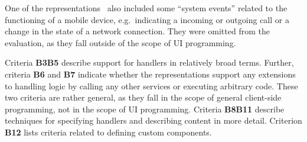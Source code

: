 One of the representations~\cite{Gaouar2018} also included some \enquote{system events} related to the functioning of a mobile device, e.g.\ indicating a incoming or outgoing call or a change in the state of a network connection.
They were omitted from the evaluation, as they fall outside of the scope of UI programming.

Criteria \textbf{B3}\textendash\textbf{B5} describe support for handlers in relatively broad terms.
Further, criteria \textbf{B6} and \textbf{B7} indicate whether the representations support any extensions to handling logic by calling any other services or executing arbitrary code.
These two criteria are rather general, as they fall in the scope of general client-side programming, not in the scope of UI programming.
Criteria \textbf{B8}\textendash\textbf{B11} describe techniques for specifying handlers and describing content in more detail.
Criterion \textbf{B12} lists criteria related to defining custom components.

